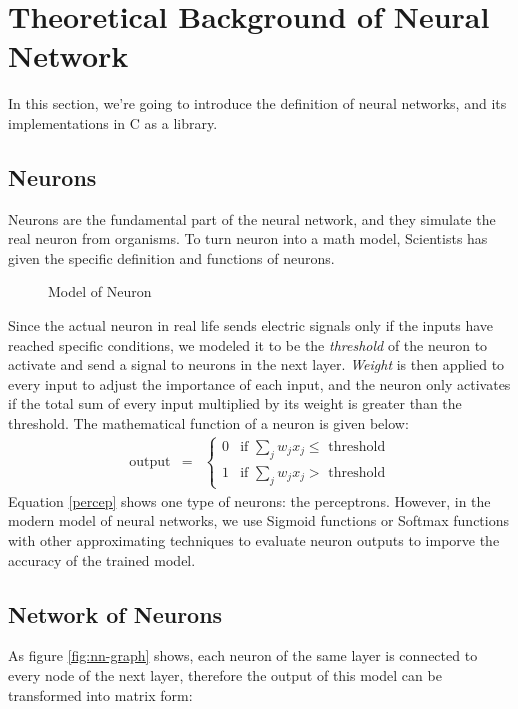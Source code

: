 \section{Theoretical Background of Neural Network}
    In this section, we're going to introduce the definition of neural networks, and its implementations in C as a library.
	\subsection{Neurons}
	Neurons are the fundamental part of the neural network, and they simulate the real neuron from organisms. To turn neuron into a math model, Scientists has given the specific definition and functions of neurons.   
	
	\begin{figure}[h]
	    \centering
	
	    \caption{Model of Neuron \cite{ref4}}
	    \label{fig:my_label}
	\end{figure}
	
	Since the actual neuron in real life sends electric signals only if the inputs have reached  specific conditions, we modeled it to be the \emph{threshold} of the neuron to activate and send a signal to neurons in the next layer. \emph{Weight} is then applied to every input to adjust the importance of each input, and the neuron only activates if the total sum of every input multiplied by its weight is greater than the threshold. The mathematical function of a neuron is given below:
	\begin{eqnarray}
  \mbox{output} & = & \left\{ \begin{array}{ll}
      0 & \mbox{if } \sum_j w_j x_j \leq \mbox{ threshold} \\
      1 & \mbox{if } \sum_j w_j x_j > \mbox{ threshold}
      \end{array} \right.
      \label{percep}
\end{eqnarray}
	Equation \ref{percep} shows one type of neurons: the perceptrons. However, in the modern model of neural networks, we use Sigmoid functions or Softmax functions with other approximating techniques to evaluate neuron outputs to imporve the accuracy of the trained model.   
	\subsection{Network of Neurons}
	As figure \ref{fig:nn-graph} shows, each neuron of the same layer is connected to every node of the next layer, therefore the output of this model can be transformed into matrix form:\\
